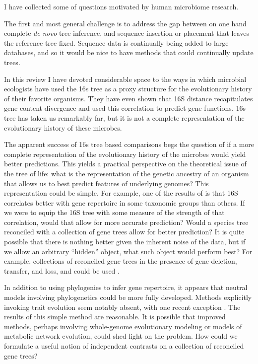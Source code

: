 \documentclass{amsart}
\begin{document}
I have collected some of questions motivated by human microbiome research.

The first and most general challenge is to address the gap between on one hand complete \emph{de novo} tree inference, and sequence insertion or placement that leaves the reference tree fixed.
Sequence data is continually being added to large databases, and so it would be nice to have methods that could continually update trees.

In this review I have devoted considerable space to the ways in which microbial ecologists have used the 16s tree as a proxy structure for the evolutionary history of their favorite organisms.
They have even shown that 16S distance recapitulates gene content divergence and used this correlation to predict gene functions.
16s tree has taken us remarkably far, but it is not a complete representation of the evolutionary history of these microbes.

The apparent success of 16s tree based comparisons begs the question of if a more complete representation of the evolutionary history of the microbes would yield better predictions.
This yields a practical perspective on the theoretical issue of the tree of life: what is the representation of the genetic ancestry of an organism that allows us to best predict features of underlying genomes?
This representation could be simple.
For example, one of the results of \citet{zaneveld2010ribosomal} is that 16S correlates better with gene repertoire in some taxonomic groups than others.
If we were to equip the 16S tree with some measure of the strength of that correlation, would that allow for more accurate prediction?
Would a species tree reconciled with a collection of gene trees allow for better prediction?
It is quite possible that there is nothing better given the inherent noise of the data, but if we allow an arbitrary ``hidden'' object, what such object would perform best?
For example, collections of reconciled gene trees in the presence of gene deletion, transfer, and loss, and could be used \citep[see][for interesting recent results]{szollHosi2013lateral,szollHosi2013efficient}.

In addition to using phylogenies to infer gene repertoire, it appears that neutral models involving phylogenetics could be more fully developed.
Methods explicitly invoking trait evolution seem notably absent, with one recent exception \citep{langille2013predictive}.
The results of this simple method are reasonable.
It is possible that improved methods, perhaps involving whole-genome evolutionary modeling or models of metabolic network evolution, could shed light on the problem.
How could we formulate a useful notion of independent contrasts \citep{felsenstein1985phylogenies} on a collection of reconciled gene trees?
\end{document}

